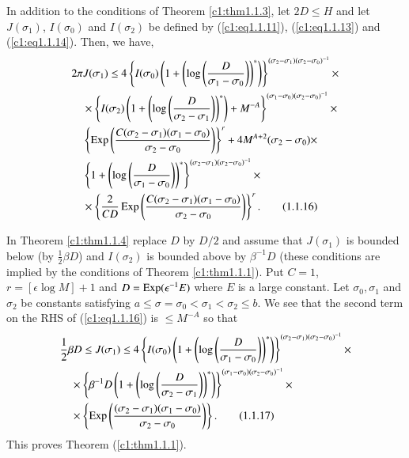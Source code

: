 \begin{theorem}\label{c1:thm1.1.4}
In addition to the conditions of Theorem  \ref{c1:thm1.1.3}, let $2D \leq H$ and let $J(\sigma_1)$, $I(\sigma_0)$ and $I(\sigma_2)$ be defined by (\ref{c1:eq1.1.11}), (\ref{c1:eq1.1.13}) and (\ref{c1:eq1.1.14}). Then, we have,
\begin{align*}
& 2 \pi J (\sigma_1) \leq 4 \left\{ I(\sigma_0) \left(1+ \left(\log
  \left( \frac{D}{\sigma_1 - \sigma_0}\right) \right)^*
  \right)\right\}^{(\sigma_2 - \sigma_1) (\sigma_2 - \sigma_0)^{-1}}
  \times\\ 
&\quad \times \left\{ I (\sigma_2) \left(1+ \left( \log \left(
  \frac{D}{\sigma_2 - \sigma_1}\right)\right)^* \right) +
  M^{-A}\right\}^{(\sigma_1 - \sigma_0) (\sigma_2 - \sigma_0)^{-1}}
  \times\\ 
&\quad \left\{\operatorname{Exp} \left(\frac{C(\sigma_2 - \sigma_1) (\sigma_1 -
    \sigma_0)}{\sigma_2 - \sigma_0} \right) \right\}^r + 4 M^{A+2}
  (\sigma_2 - \sigma_0)\times\\ 
&\quad\left\{ 1+ \left(\log
  \left(\frac{D}{\sigma_1-\sigma_0} \right)
  \right)^*\right\}^{(\sigma_2 - \sigma_1) (\sigma_2 - \sigma_0)^{-1}}
  \times \\ 
&\quad\times \left\{ \frac{2}{CD} \operatorname{Exp} \left( \frac{C(\sigma_2 -
    \sigma_1)(\sigma_1 - \sigma_0)}{\sigma_2 -
    \sigma_0}\right)\right\}^r. \tag{1.1.16}\label{c1:eq1.1.16} 
\end{align*}


 In Theorem  \ref{c1:thm1.1.4} replace $D$ by $D/2$ and assume that $J(\sigma_1)$ is bounded below (by $\frac{1}{2} \beta D$) and $I(\sigma_2)$ is bounded above by $\beta^{-1} D$ (these conditions are implied by the conditions of Theorem  \ref{c1:thm1.1.1}). Put $C=1$, $r = [\epsilon \log M] + 1$ and $D = \operatorname{Exp} (\epsilon^{-1}E)$ where $E$ is a large constant. Let $\sigma_0, \sigma_1$ and $\sigma_2$ be constants satisfying $a\leq \sigma = \sigma_0 < \sigma_1 < \sigma_2 \leq b$. We see that the second term on the RHS of (\ref{c1:eq1.1.16}) is $\leq M^{-A}$ so that 
\begin{align*}
& \frac{1}{2} \beta D \leq J (\sigma_1) \leq 4 \left\{ I(\sigma_0)
  \left(1+ \left(\log \left(\frac{D}{\sigma_1 - \sigma_0} \right)
  \right)^* \right)\right\}^{(\sigma_2 - \sigma_1) (\sigma_2 -
    \sigma_0)^{-1}} \times \\ 
&\quad\times  \left\{\beta^{-1} D \left(1+ \left(\log \left(
  \frac{D}{\sigma_2 - \sigma_1}\right) \right)^{*} \right)
  \right\}^{(\sigma_1 -\sigma_0) (\sigma_2-\sigma_0)^{-1}}\times\\ 
&\quad\times\left\{\operatorname{Exp}\left( \frac{(\sigma_2 - \sigma_1) (\sigma_1 -
    \sigma_0)}{\sigma_2-\sigma_0} \right) \right\}.
  \tag{1.1.17}\label{c1:eq1.1.17} 
\end{align*}
This proves Theorem (\ref{c1:thm1.1.1}).
\end{theorem}

